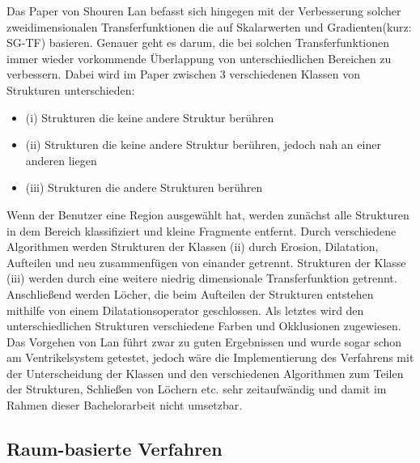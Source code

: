 Das Paper von Shouren Lan \cite{lan2017improving} befasst sich hingegen mit der Verbesserung solcher zweidimensionalen Transferfunktionen die auf Skalarwerten und Gradienten(kurz: SG-TF) basieren.
\newline
Genauer geht es darum, die bei solchen Transferfunktionen immer wieder vorkommende Überlappung von unterschiedlichen Bereichen zu verbessern.
\newline
Dabei wird im Paper zwischen 3 verschiedenen Klassen von Strukturen unterschieden:
\begin{itemize}
\item (i) Strukturen die keine andere Struktur berühren
\item (ii) Strukturen die keine andere Struktur berühren, jedoch nah an einer anderen liegen
\item (iii) Strukturen die andere Strukturen berühren
\end{itemize} 
Wenn der Benutzer eine Region ausgewählt hat, werden zunächst alle Strukturen in dem Bereich klassifiziert und kleine Fragmente entfernt. Durch verschiedene Algorithmen werden Strukturen der Klassen (ii) durch Erosion, Dilatation, Aufteilen und neu zusammenfügen von einander getrennt. Strukturen der Klasse (iii) werden durch eine weitere niedrig dimensionale Transferfunktion getrennt.
\newline
Anschließend werden Löcher, die beim Aufteilen der Strukturen entstehen mithilfe von einem Dilatationsoperator geschlossen. Als letztes wird den unterschiedlichen Strukturen verschiedene Farben und Okklusionen zugewiesen.
\newline
Das Vorgehen von Lan führt zwar zu guten Ergebnissen und wurde sogar schon am Ventrikelsystem getestet, jedoch wäre die Implementierung des Verfahrens mit der Unterscheidung der Klassen und den verschiedenen Algorithmen zum Teilen der Strukturen, Schließen von Löchern etc. sehr zeitaufwändig und damit im Rahmen dieser Bachelorarbeit  nicht umsetzbar.



\subsection{Raum-basierte Verfahren}

